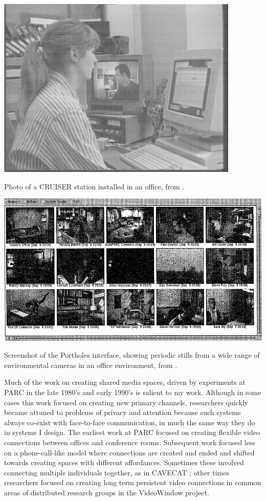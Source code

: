 \documentclass{tufte-handout}
\begin{document}
\begin{marginfigure}
	\includegraphics{figures/CRUISER.png}
	\caption{Photo of a CRUISER station installed in an office, from \citep{Fish:1992vz}.}
	\label{fig:cruiser}
\end{marginfigure}

\begin{marginfigure}
	\includegraphics{figures/portholes.png}
	\caption{Screenshot of the Portholes interface, showing periodic stills from a wide range of environmental cameras in an office environment, from \citep{Dourish:1992fu}.}
	\label{fig:portholes}
\end{marginfigure}


Much of the work on creating shared media spaces, driven by experiments at PARC in the late 1980's and early 1990's is salient to my work. Although in some cases this work focused on creating new primary channels, researchers quickly became attuned to problems of privacy and attention because such systems always co-exist with face-to-face communication, in much the same way they do in systems I design. The earliest work at PARC \citep{Olson:1991vz} focused on creating flexible video connections between offices and conference rooms. Subsequent work focused less on a phone-call-like model where connections are created and ended and shifted towards creating spaces with different affordances. Sometimes these involved connecting multiple individuals together, as in CAVECAT \citep{Mantei:1991ww}; other times researchers focused on creating long term persistent video connections in common areas of distributed research groups in the VideoWindow \citep{Fish:1990fn} project. 
\end{document}
